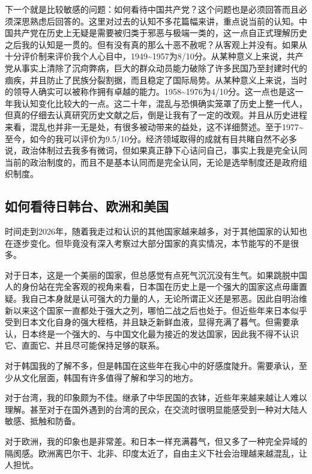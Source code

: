 \documentclass[11pt,twoside,fontset=none,scheme=plain]{ctexart}
\begin{document}
下一个就是比较敏感的问题：如何看待中国共产党？这个问题也是必须回答而且必须深思熟虑后回答的。这里对过去的认知不多花篇幅来讲，重点说当前的认知。中国共产党在历史上无疑是需要被归类于邪恶与极端一类的，这一点自正式理解历史之后我的认知是一贯的。但有没有真的那么十恶不赦呢？从客观上并没有。如果从十分评价制来评价我个人心目中，1949\textasciitilde 1957为8/10分。从某种意义上来说，共产党从事实上清除了沉疴弊病，巨大的群众动员能力破除了许多民国乃至封建时代的痼疾，并且防止了民族分裂割据，而且稳定了国际局势。从某种意义上来说，当时的领导人确实可以被称作拥有卓越的能力。1958\textasciitilde 1976为4/10分。这一点也是这一年我认知变化比较大的一点。这二十年，混乱与恐惧确实笼罩了历史上整一代人，但真的仔细去认真研究历史文献之后，倒是让我有了一定的改观。并且从历史进程来看，混乱也并非一无是处，有很多被动带来的益处，这不详细赘述。至于1977\textasciitilde 至今，如今的我可以评价为9.5/10分。经济领域取得的成就有目共睹自然不必多说，政治体制过去我多有微词，但如果真正静下心诘问自己，事实上我是完全认同当前的政治制度的，而且不是基本认同而是完全认同，无论是选举制度还是政府组织制度。

\subsection{如何看待日韩台、欧洲和美国}
时间走到2026年，随着我走过和认识的其他国家越来越多，对于其他国家的认知也在逐步变化。但毕竟没有深入考察过大部分国家的真实情况，本节能写的不是很多。

对于日本，这是一个美丽的国家，但总感觉有点死气沉沉没有生气。如果跳脱中国人的身份站在完全客观的视角来看，日本国在历史上是一个强大的国家这点毋庸置疑。我自己本身就是认可强大的力量的人，无论所谓正义还是邪恶。因此自明治维新以来这个国家一直都处于强大之列，哪怕二战之后也处于。但近些年来日本似乎受到日本文化自身的强大桎梏，并且缺乏新鲜血液，显得充满了暮气。但需要承认，日本终是一个强大的、与中国文化最为接近的发达国家，因此我不得不认识它、直面它、并且尽可能保持足够的联系。

对于韩国我的了解不多，但是韩国在这些年在我心中的好感度陡升。需要承认，至少从文化层面，韩国有许多值得了解和学习的地方。

对于台湾，我的印象颇为不佳。继承了中华民国的衣钵，近些年来越来越让人难以理解。甚至对于在国外遇到的台湾的民众，在交流时很明显能感受到一种对大陆人敏感、抵触和防备。

对于欧洲，我的印象也是非常差。和日本一样充满暮气，但又多了一种完全异域的隔阂感。欧洲离巴尔干、北非、印度太近了，自由主义下社会治理越来越混乱，让人担忧。
\end{document}

